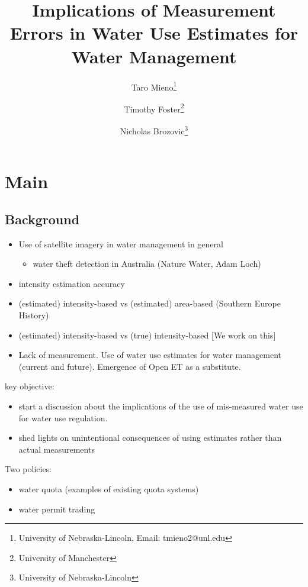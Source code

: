 \documentclass[
  letterpaper,
  DIV=11,
  numbers=noendperiod]{scrartcl}
\title{Implications of Measurement Errors in Water Use Estimates for
Water Management}
\author{Taro Mieno\footnote{University of Nebraska-Lincoln, Email:
  tmieno2@unl.edu} \and Timothy Foster\footnote{University of Manchester} \and Nicholas
Brozovic\footnote{University of Nebraska-Lincoln}}
\date{}
\providecommand{\tightlist}{%
  \setlength{\itemsep}{0pt}\setlength{\parskip}{0pt}}\usepackage{longtable,booktabs,array}
\begin{document}
\maketitle


\section{Main}\label{main}

\subsection{Background}\label{background}

\begin{itemize}
\item
  Use of satellite imagery in water management in general

  \begin{itemize}
  \tightlist
  \item
    water theft detection in Australia (Nature Water, Adam Loch)
  \end{itemize}
\item
  intensity estimation accuracy
\item
  (estimated) intensity-based vs (estimated) area-based (Southern Europe
  History)
\item
  (estimated) intensity-based vs (true) intensity-based {[}We work on
  this{]}
\item
  Lack of measurement. Use of water use estimates for water management
  (current and future). Emergence of Open ET as a substitute.
\end{itemize}

key objective:

\begin{itemize}
\item
  start a discussion about the implications of the use of mis-measured
  water use for water use regulation.
\item
  shed lights on unintentional consequences of using estimates rather
  than actual measurements
\end{itemize}

Two policies:

\begin{itemize}
\tightlist
\item
  water quota (examples of existing quota systems)
\item
  water permit trading
\end{itemize}
\end{document}
